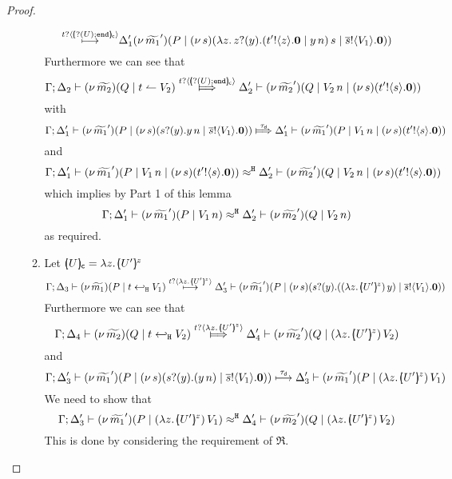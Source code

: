 \begin{proof}
\begin{enumerate}
\begin{enumerate}
\[								{\stackrel{t ? \langle [\!\!(? (U) ; \mathtt{end})\!\!]_{\mathsf{c}} \rangle}{\longmapsto}}
								{\Delta_1'}{}{(\nu\, \widetilde{m_1}')(P \;|\; (\nu\, s)(\lambda z.\, z ? (y) . ( t' ! \langle z \rangle . \mathbf{0} \;|\; y\, {n} )\, {s} \;|\; \overline{s} ! \langle V_1 \rangle . \mathbf{0}))}
							\]
							Furthermore we can see that
							\[
	\horel{\Gamma}{\Delta_2}{\newsp{\widetilde{m_2}}{Q \Par \ntrigger{t}{V_2}  } }
								{\Hby{\bactinp{t}{\omapchar{\btinp{U} \tinact}}}}
								{\Delta_2'}{\newsp{\widetilde{m_2}'}{Q \Par \appl{V_2}{n} \Par \newsp{s}{\bout{t'}{s} \inact}}}
							\]
							with
							\[
								\horel{\Gamma}{\Delta_1'}{\newsp{\widetilde{m_1}'}{P \Par \newsp{s}{\binp{s}{y} \appl{y}{n} \Par \bout{\dual{s}}{V_1} \inact}}}
								{\Hby{\dtau}}
								{\Delta_1'}{\newsp{\widetilde{m_1}'}{P \Par \appl{V_1}{n} \Par \newsp{s}{\bout{t'}{s} \inact}}}
							\]
							and
							\[
								\Gamma; \Delta_1' \vdash (\nu\, \widetilde{m_1}')(P \;|\; V_1\, {n} \;|\; (\nu\, s)(t' ! \langle s \rangle . \mathbf{0})) \approx^\mathtt{H} \Delta_2' \vdash (\nu\, \widetilde{m_2}')(Q \;|\; V_2\, {n} \;|\; (\nu\, s)(t' ! \langle s \rangle . \mathbf{0}))
							\]
							which implies by Part 1 of this lemma
							\[
								\Gamma; \Delta_1' \vdash (\nu\, \widetilde{m_1}')(P \;|\; V_1\, {n}) \approx^\mathtt{H} \Delta_2' \vdash (\nu\, \widetilde{m_2}')(Q \;|\; V_2\, {n})
							\]
							as required.

						\item	Let $\omapchar{U} = \abs{z}{\mapchar{U'}{z}} $
							\[
								\horel{\Gamma}{\Delta_3}{\newsp{\widetilde{m_1}}{P \Par \htrigger{t}{V_1}  } }
								{\hby{\bactinp{t}{\abs{z}{\mapchar{U'}{z}}}}}
								{\Delta_3'}{\newsp{\widetilde{m_1}'}{P \Par \newsp{s}{\binp{s}{y} {(\appl{(\abs{z}{\mapchar{U'}{z}})}{y}}) \Par \bout{\dual{s}}{V_1} \inact}}}
							\]
							Furthermore we can see that
							\[
								\horel{\Gamma}{\Delta_4}{\newsp{\widetilde{m_2}}{Q \Par \htrigger{t}{V_2}  } }
								{\Hby{\bactinp{t}{\abs{z}{\mapchar{U'}{z}}}}}
								{\Delta_4'}{\newsp{\widetilde{m_2}'}{Q \Par \appl{(\abs{z}{\mapchar{U'}{z}})}{V_2}}}
							\]
							and
							\[
								\Gamma; \Delta_3' \vdash (\nu\, \widetilde{m_1}')(P \;|\; (\nu\, s)(s ? (y) .{(y\, {n})} \;|\; \overline{s} ! \langle V_1 \rangle . \mathbf{0})) \stackrel{\tau_{\mathsf{d}}}{\longmapsto} \Delta_3' \vdash (\nu\, \widetilde{m_1}')(P \;|\; (\lambda z.\,[\!\!(U')\!\!]^{z})\, {V_1})
							\]
							We need to show that
							\[
								\horel{\Gamma}{\Delta_3'}{\newsp{\widetilde{m_1}'}{P \Par \appl{(\abs{z}{\mapchar{U'}{z}})}{V_1}}}
								{\hwb}
								{\Delta_4'}{\newsp{\widetilde{m_2}'}{Q \Par \appl{(\abs{z}{\mapchar{U'}{z}})}{V_2}}}
							\]
							This is done by considering the requirement of $\Re$.


\end{enumerate}
\end{enumerate}
\end{proof}
